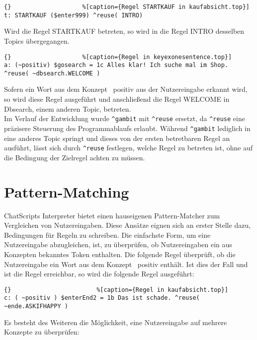 \begin{lstlisting}{}					%[caption={Regel STARTKAUF in kaufabsicht.top}]
t: STARTKAUF ($enter999) ^reuse( INTRO)
\end{lstlisting}

Wird die Regel STARTKAUF betreten, so wird in die Regel INTRO desselben Topics übergegangen. 

\begin{lstlisting}{}					%[caption={Regel in keyexonesentence.top}]
a: (~positiv) $gosearch = 1c Alles klar! Ich suche mal im Shop. ^reuse( ~dbsearch.WELCOME )
\end{lstlisting}

Sofern ein Wort aus dem Konzept ~positiv aus der Nutzereingabe erkannt wird, so wird diese Regel ausgeführt und anschließend die Regel WELCOME in Dbsearch, einem anderen Topic, betreten.\\

Im Verlauf der Entwicklung wurde \lstinline|^gambit| mit \lstinline|^reuse| ersetzt, da \lstinline|^reuse| eine präzisere Steuerung des Programmablaufs erlaubt. Während \lstinline|^gambit| lediglich in eine anderes Topic springt und dieses von der ersten betretbaren Regel an ausführt, lässt sich durch \lstinline|^reuse| festlegen, welche Regel zu betreten ist, ohne auf die Bedingung der Zielregel achten zu müssen.\\


\section{Pattern-Matching}
\label{sec:ChatScript: Pattern-Matching}

ChatScripts Interpreter bietet einen hauseigenen Pattern-Matcher zum Vergleichen von Nutzereingaben. Diese Ansätze eignen sich an erster Stelle dazu, Bedingungen für Regeln zu schreiben. Die einfachste Form, um eine Nutzereingabe abzugleichen, ist, zu überprüfen, ob Nutzereingaben ein aus Konzepten bekanntes Token enthalten. Die folgende Regel überprüft, ob die Nutzereingabe ein Wort aus dem Konzept ~positiv enthält. Ist dies der Fall und ist die Regel erreichbar, so wird die folgende Regel ausgeführt:

\begin{lstlisting}{}						%[caption={Regel in kaufabsicht.top}]
c: ( ~positiv ) $enterEnd2 = 1b Das ist schade. ^reuse( ~ende.ASKIFHAPPY )
\end{lstlisting}

Es besteht des Weiteren die Möglichkeit, eine Nutzereingabe auf mehrere Konzepte zu überprüfen: 

